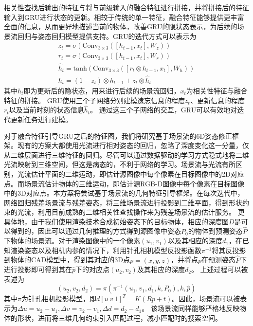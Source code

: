 \documentclass[12pt]{article}
\begin{document}
相关性查找后输出的特征与将与前级输入的融合特征进行拼接，并将拼接后的特征输入到GRU进行状态的更新。相较于传统的单一特征，融合特征能够提供更丰富全面的信息，从而更好地描述当前的物体，改善GRU的隐状态表示，为后续的场景流回归与姿态回归模型提供支持。GRU的迭代方式可以表示为
\begin{gather}
        z_t = \sigma(\mathrm{Conv}_{3\times3}([h_{t-1}, x_t], W_z)) \\
        r_t = \sigma(\mathrm{Conv}_{3\times3}([h_{t-1}, x_t], W_r)) \\
        \hat{h}_t = \mathrm{tanh}(\mathrm{Conv}_{3\times3}([r_t \otimes h_{t-1}, x_t], W_h)) \\
        h_t = (1 - z_t)\otimes h_{t-1} + z_t \otimes \hat{h}_t
\end{gather}
其中$h_t$即为更新后的隐状态，用来进行后续的场景流回归，$x_t$为相关性特征与融合特征的拼接。
GRU使用三个子网络分别建模遗忘信息的程度$z_t$、更新信息的程度$r_t$以及当前时刻的状态信息$\hat{h}_t$。
通过这三个子网络的交互，GRU可以有效地对迭代更新任务进行建模。

对于融合特征引导GRU之后的特征图，我们将研究基于场景流的6D姿态修正框架。现有的方案大都使用光流进行相对姿态的回归，忽略了深度变化这一分量，仅从二维层面进行三维特征的回归。尽管可以通过数据驱动的学习方式隐式地将二维光流映射到三维空间，但这是病态的，不利于网络的学习。场景流与光流有所区别，光流估计平面的二维运动，即估计源图像中每个像素在目标图像中的2D对应点。而场景流估计物体的三维运动，即估计源RGB-D图像中每个像素在目标图像中的3D对应点。本方案将尝试基于场景流的几何特征引导框架。在每次迭代中，网络回归残差场景流与残差姿态，将三维场景流进行投影到二维平面，得到形状约束的光流，利用目前成熟的二维相关性查找操作来为残差场景流的估计服务。
更具体地，由于我们使用渲染技术合成初始姿态下的目标物体，相应的深度图$D$是可以得到的，因此可以通过几何推理的方式得到源图像中姿态$P_0$的物体到预测姿态$\hat{P}$下物体的场景流。对于渲染图像中的一个像素$(u_1,v_1)$以及其相应的深度$d_1$，在已知渲染姿态以及相机内参的情况下，利用针孔相机模型反投影函数$\pi^{-1}$将其反投影到物体的CAD模型中，得到其对应的3D点$p=(x,y,z)$，并将点$p$在预测姿态$\hat{P}$下进行投影即可得到其在$\hat{p}$下的对应点$(u_2,v_2)$及其相应的深度$d_2$。
上述过程可以被表述为
\begin{equation}
    (u_2,v_2,d_2) = \pi(\pi^{-1}(u_1, v_1,d_1, k, P_0), k, \hat{p})
\end{equation}
其中$\pi$为针孔相机投影模型，即$d[u~v~1]^T=K(Rp+t)$。因此，场景流可以被表示为$\Delta u = u_2 - u_1, \Delta v = v_2 - v_1, \Delta d = d_2 - d_1$。
该场景流同样能够严格地反映物体的形状，进而将三维几何约束引入匹配过程，减小匹配时的搜索空间。
\end{document}
